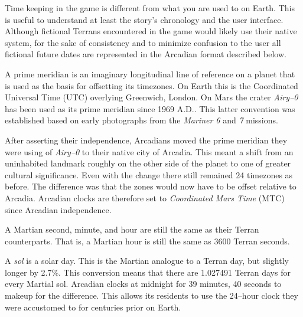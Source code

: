 

Time keeping in the game is different from what you are used to on Earth. This is useful to understand at least the story's chronology and the user interface. Although fictional Terrans encountered in the game would likely use their native system, for the sake of consistency and to minimize confusion to the user all fictional future dates are represented in the Arcadian format described below.


A prime meridian is an imaginary longitudinal line of reference on a planet that is used as the basis for offsetting its timezones. On Earth this is the Coordinated Universal Time (UTC) overlying Greenwich, London. On Mars the crater {\it Airy--0} has been used as its prime meridian since 1969 A.D.. This latter convention was established based on early photographs from the {\it Mariner 6} and {\it 7} missions.

After asserting their independence, Arcadians moved the prime meridian they were using of {\it Airy--0} to their native city of Arcadia. This meant a shift from an uninhabited landmark roughly on the other side of the planet to one of greater cultural significance. Even with the change there still remained 24 timezones as before. The difference was that the zones would now have to be offset relative to Arcadia. Arcadian clocks are therefore set to {\it Coordinated Mars Time} (MTC) since Arcadian independence.


A Martian second, minute, and hour are still the same as their Terran counterparts. That is, a Martian hour is still the same as 3600 Terran seconds.

A {\it sol} is a solar day. This is the Martian analogue to a Terran day, but slightly longer by 2.7\%. This conversion means that there are 1.027491 Terran days for every Martial sol. Arcadian clocks  at midnight for 39 minutes, 40 seconds to makeup for the difference. This allows its residents to use the 24--hour clock they were accustomed to for centuries prior on Earth.

